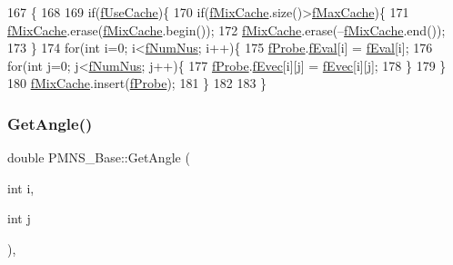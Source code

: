 \begin{DoxyCode}
167 \{
168 
169   \textcolor{keywordflow}{if}(\hyperlink{classOscProb_1_1PMNS__Base_ad28c12ef897b5555eda509ea55c99107}{fUseCache})\{
170     \textcolor{keywordflow}{if}(\hyperlink{classOscProb_1_1PMNS__Base_a8159424f20197a3a7145fe3bf2c11176}{fMixCache}.size()>\hyperlink{classOscProb_1_1PMNS__Base_a74c13356eafec2490d8c3c19759ba7f0}{fMaxCache})\{
171       \hyperlink{classOscProb_1_1PMNS__Base_a8159424f20197a3a7145fe3bf2c11176}{fMixCache}.erase(\hyperlink{classOscProb_1_1PMNS__Base_a8159424f20197a3a7145fe3bf2c11176}{fMixCache}.begin());
172       \hyperlink{classOscProb_1_1PMNS__Base_a8159424f20197a3a7145fe3bf2c11176}{fMixCache}.erase(--\hyperlink{classOscProb_1_1PMNS__Base_a8159424f20197a3a7145fe3bf2c11176}{fMixCache}.end());
173     \}
174     \textcolor{keywordflow}{for}(\textcolor{keywordtype}{int} i=0; i<\hyperlink{classOscProb_1_1PMNS__Base_a24bb74bed63569dfe88b18fa6a08060e}{fNumNus}; i++)\{
175       \hyperlink{classOscProb_1_1PMNS__Base_ab1fe4800ee3ae48df4fc942dce00e0d3}{fProbe}.\hyperlink{structOscProb_1_1EigenPoint_a5c5e729d82e3aca1964c1777f4882f9d}{fEval}[i] = \hyperlink{classOscProb_1_1PMNS__Base_a6319c34d7decbb9d7d6da279c06e8c2d}{fEval}[i];
176       \textcolor{keywordflow}{for}(\textcolor{keywordtype}{int} j=0; j<\hyperlink{classOscProb_1_1PMNS__Base_a24bb74bed63569dfe88b18fa6a08060e}{fNumNus}; j++)\{
177         \hyperlink{classOscProb_1_1PMNS__Base_ab1fe4800ee3ae48df4fc942dce00e0d3}{fProbe}.\hyperlink{structOscProb_1_1EigenPoint_adf3ccb3d88ea1ae6ef3635fea8748e09}{fEvec}[i][j] = \hyperlink{classOscProb_1_1PMNS__Base_a87be137356c5f27ab83cab5e1298ef8f}{fEvec}[i][j];
178       \}
179     \}
180     \hyperlink{classOscProb_1_1PMNS__Base_a8159424f20197a3a7145fe3bf2c11176}{fMixCache}.insert(\hyperlink{classOscProb_1_1PMNS__Base_ab1fe4800ee3ae48df4fc942dce00e0d3}{fProbe});
181   \}
182 
183 \}
\end{DoxyCode}
\mbox{\label{classOscProb_1_1PMNS__Base_acee137091304c919642293ddf015bbc8}} 
\subsubsection{\texorpdfstring{Get\+Angle()}{GetAngle()}}
{\footnotesize\ttfamily double P\+M\+N\+S\+\_\+\+Base\+::\+Get\+Angle (\begin{DoxyParamCaption}\item[{int}]{i,  }\item[{int}]{j }\end{DoxyParamCaption})\hspace{0.3cm}{\ttfamily [virtual]}, {\ttfamily [inherited]}}


